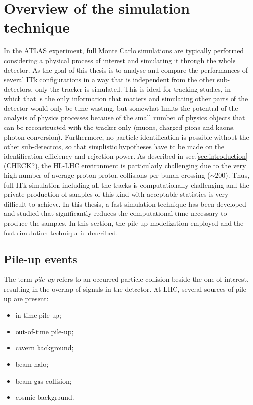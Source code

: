 \documentclass[a4paper,twoside,12pt]{article}
\begin{document}
\newpage

\section{Overview of the simulation technique} 
In the ATLAS experiment, full Monte Carlo simulations are typically performed considering 
a physical process of interest and simulating it through the whole detector. As the goal of this
thesis is to analyse and compare the performances of several ITk configurations in a way that
is independent from the other sub-detectors, only the tracker is simulated. This is 
ideal for tracking studies, in which that is the only information that matters and simulating
other parts of the detector would only be time wasting, but
somewhat 
limits the potential of the analysis of physics processes because of the small number of physics objects that can be reconstructed with the tracker only (muons, charged pions and kaons, photon conversion). Furthermore, no particle identification is possible without the other sub-detectors, so that 
simplistic hypotheses have to be made on the identification efficiency and rejection power.
As described in sec.\ref{sec:introduction} (CHECK?), the HL-LHC environment is particularly
challenging due to the very high number of average proton-proton collisions per bunch crossing ($\sim 200$). Thus, full ITk simulation including all the tracks is computationally challenging 
and the private production of samples of this kind with acceptable statistics is very difficult
to achieve. In this thesis, a fast simulation technique has been developed and studied that
significantly reduces the computational time necessary to produce the samples. In this section,
the pile-up modelization employed and the fast simulation technique is described.


\subsection{Pile-up events}
The term \textit{pile-up} refers to an occurred particle collision beside the one of interest, resulting in 
the overlap of signals in the detector.
At LHC, several sources of pile-up are present:

\begin{itemize}
\item in-time pile-up;
\item out-of-time pile-up;
\item cavern background;
\item beam halo;
\item beam-gas collision;
\item cosmic background.
\end{itemize}
\end{document}

